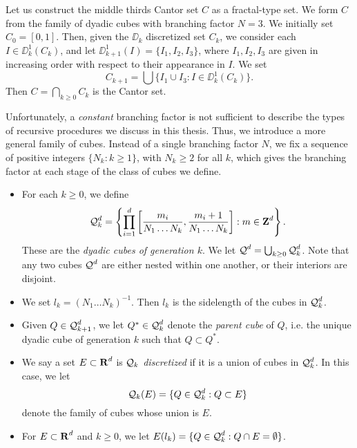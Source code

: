 \begin{example}
	Let us construct the middle thirds Cantor set $C$ as a fractal-type set. We form $C$ from the family of dyadic cubes with branching factor $N = 3$. We initially set $C_0 = [0,1]$. Then, given the $\DD_k$ discretized set $C_k$, we consider each $I \in \DD_k^1(C_k)$, and let $\DD_{k+1}^1(I) = \{ I_1, I_2, I_3 \}$, where $I_1, I_2, I_3$ are given in increasing order with respect to their appearance in $I$. We set
	\[ C_{k+1} = \bigcup \{ I_1 \cup I_3 : I \in \DD_k^1(C_k) \}. \]
	Then $C = \bigcap_{k \geq 0} C_k$ is the Cantor set.
\end{example}

Unfortunately, a \emph{constant} branching factor is not sufficient to describe the types of recursive procedures we discuss in this thesis. Thus, we introduce a more general family of cubes. Instead of a single branching factor $N$, we fix a sequence of positive integers $\{ N_k : k \geq 1 \}$, with $N_k \geq 2$ for all $k$, which gives the branching factor at each stage of the class of cubes we define.
%
\begin{itemize}
	\item For each $k \geq 0$, we define 
	\[ \operatorname{\mathcal{Q}}_k^d = \left\{ \prod_{i = 1}^d \left[ \frac{m_i}{N_1 \dots N_k}, \frac{m_i + 1}{N_1 \dots N_k} \right] : m \in \operatorname{\mathbf{Z}}^d \right\}. \]
	These are the \emph{dyadic cubes of generation $k$}. We let $\operatorname{\mathcal{Q}}^d = \bigcup_{k \geq 0} \operatorname{\mathcal{Q}}_k^d$. Note that any two cubes $\operatorname{\mathcal{Q}}^d$ are either nested within one another, or their interiors are disjoint.

	\item We set $l_k = (N_1 \dots N_k)^{-1}$. Then $l_k$ is the sidelength of the cubes in $\operatorname{\mathcal{Q}}_k^d$.

	\item Given $Q \in \operatorname{\mathcal{Q}}_{k+1}^d$, we let $Q^* \in \operatorname{\mathcal{Q}}_k^d$ denote the \emph{parent cube} of $Q$, i.e. the unique dyadic cube of generation $k$ such that $Q \subset Q^*$.

	\item We say a set $E \subset \operatorname{\mathbf{R}}^d$ is \emph{$\operatorname{\mathcal{Q}}_k$ discretized} if it is a union of cubes in $\operatorname{\mathcal{Q}}_k^d$. In this case, we let
	\[ \operatorname{\mathcal{Q}}_k(E) = \{ Q \in \operatorname{\mathcal{Q}}_k^d: Q \subset E \} \]
	denote the family of cubes whose union is $E$.

	\item For $E \subset \operatorname{\mathbf{R}}^d$ and $k \geq 0$, we let $E(l_k) = \{ Q \in \operatorname{\mathcal{Q}}_k^d : Q \cap E = \emptyset \}$.
\end{itemize}
%
